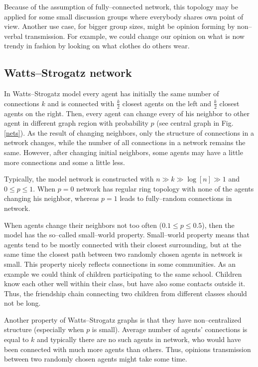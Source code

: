 \documentclass[a4paper, 12pt]{article}
\begin{document}
Because of the assumption of fully--connected network, this topology may be applied for some small discussion groups where everybody shares own point of view. Another use case, for bigger group sizes, might be opinion forming by non--verbal transmission. For example, we could change our opinion on what is now trendy in fashion by looking on what clothes do others wear.

\subsection{Watts--Strogatz network}
In Watts--Strogatz model every agent has initially the same number of connections $k$ and is connected with $\frac{k}{2}$ closest agents on the left and $\frac{k}{2}$ closest agents on the right. Then, every agent can change every of his neighbor to other agent in different graph region with probability $p$ (see central graph in Fig. \ref{nets}). As the result of changing neighbors, only the structure of connections in a network changes, while the number of all connections in a network remains the same. However, after changing initial neighbors, some agents may have a little more connections and some a little less.
\indent

Typically, the model network is constructed with $n\gg k \gg \log[n] \gg 1$ and $0 \leq p \leq 1$. When $p=0$ network has regular ring topology with none of the agents changing his neighbor, whereas $p=1$ leads to fully--random connections in network.

When agents change their neighbors not too often ($0.1 \leq p \leq 0.5$), then the model has the so--called small--world property. Small--world property means that agents tend to be mostly connected with their closest surrounding, but at the same time the  closest path between two randomly chosen agents in network is small. This property nicely reflects connections in some communities. As an example we could think of children participating to the same school. Children know each other well within their class, but have also some contacts outside it. Thus, the friendship chain connecting two children from different classes should not be long.

\indent
Another property of Watts--Strogatz graphs is that they have non--centralized structure (especially when $p$ is small). Average number of agents' connections is equal to $k$ and typically there are no such agents in network, who would have been connected with much more agents than others. Thus, opinions transmission between two randomly chosen agents might take some time.
\end{document}
